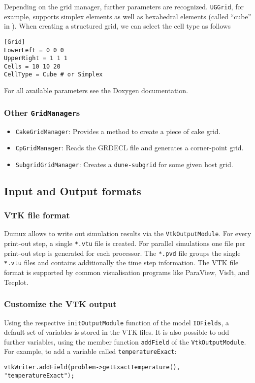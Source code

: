 Depending on the grid manager, further parameters are recognized.
\texttt{UGGrid}, for example, supports simplex elements as well as hexahedral elements
(called ``cube'' in \Dune). When creating a structured grid, we can select the cell type as follows
\begin{lstlisting}[style=DumuxParameterFile]
[Grid]
LowerLeft = 0 0 0
UpperRight = 1 1 1
Cells = 10 10 20
CellType = Cube # or Simplex
\end{lstlisting}

For all available parameters see the Doxygen documentation.

\subsubsection{Other \Dumux \texttt{GridManager}s}
\begin{itemize}
\item \texttt{CakeGridManager}: Provides a method to create a piece of cake grid.
\item \texttt{CpGridManager}: Reads the GRDECL file and generates a corner-point grid.
\item \texttt{SubgridGridManager}: Creates a \texttt{dune-subgrid} for some given host grid.
\end{itemize}

\subsection{Input and Output formats}

\subsubsection{VTK file format}
Dumux allows to write out simulation results via the \texttt{VtkOutputModule}.
For every print-out step, a single \texttt{*.vtu} file is created. For parallel simulations one file
per print-out step is generated for each processor.
The \texttt{*.pvd} file groups the single \texttt{*.vtu} files and contains additionally the time step information.
The VTK file format is supported by common visualisation programs like ParaView, VisIt, and Tecplot.

\subsubsection{Customize the VTK output}
Using the respective \texttt{initOutputModule} function of the model \texttt{IOFields}, a default
set of variables is stored in the VTK files. It is also possible to add further variables,
using the member function \texttt{addField} of the \texttt{VtkOutputModule}. For example, to add a variable called \texttt{temperatureExact}:
\begin{lstlisting}[style=DumuxCode]
vtkWriter.addField(problem->getExactTemperature(), "temperatureExact");
\end{lstlisting}

